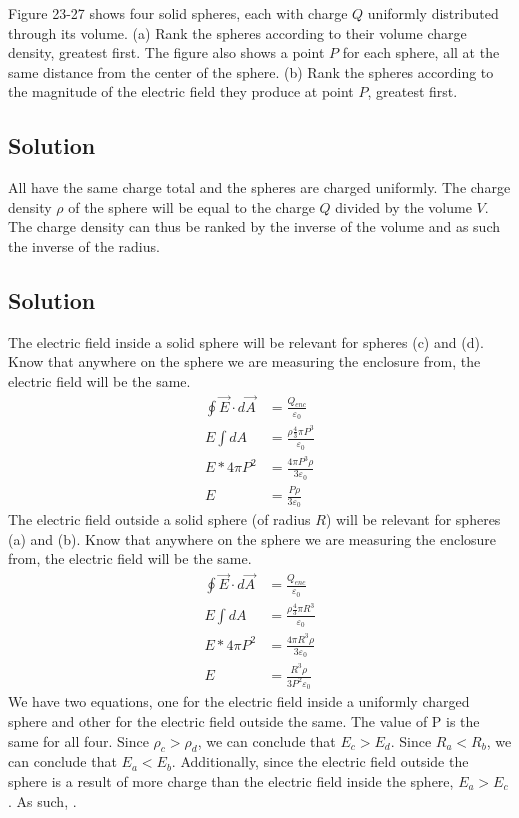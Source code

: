 \documentclass[12pt]{article}
\begin{document}
Figure 23-27 shows four solid spheres, each with charge $Q$ uniformly distributed through its volume. (a) Rank the spheres according to their volume charge density, greatest first. The figure also shows a point $P$ for each sphere, all at the same distance from the center of the sphere. (b) Rank the spheres according to the magnitude of the electric field they produce at point $P$, greatest first.

\subsection{Solution}
All have the same charge total and the spheres are charged uniformly. 
The charge density \(\rho\) of the sphere will be equal to the charge $Q$ divided by the volume $V$. 
The charge density can thus be ranked by the inverse of the volume and as such the inverse of the radius.

\subsection{Solution}
The electric field inside a solid sphere will be relevant for spheres (c) and (d). Know that anywhere on the sphere we are measuring the enclosure from, the electric field will be the same.
\begin{align*}
    \oint \vec{E} \cdot d\vec{A}    &=  \frac{Q_{enc}}{\varepsilon_0}\\
    E \int dA  &=  \frac{\rho \frac{4}{3}\pi P^3}{\varepsilon_0}\\
    E * 4\pi P^2    &=  \frac{4\pi P^3 \rho}{3 \varepsilon_0}\\
    E   &=  \frac{P \rho}{3 \varepsilon_0}
\end{align*}
The electric field outside a solid sphere (of radius $R$) will be relevant for spheres (a) and (b). Know that anywhere on the sphere we are measuring the enclosure from, the electric field will be the same.
\begin{align*}
    \oint \vec{E} \cdot d\vec{A}    &=  \frac{Q_{enc}}{\varepsilon_0}\\
    E \int dA   &=  \frac{\rho \frac{4}{3}\pi R^3}{\varepsilon_0}\\
    E * 4\pi P^2    &=  \frac{4\pi R^3 \rho}{3\varepsilon_0}\\
    E   &=  \frac{R^3 \rho}{3 P^2 \varepsilon_0}
\end{align*}
We have two equations, one for the electric field inside a uniformly charged sphere and other for the electric field outside the same. 
The value of P is the same for all four.
Since $\rho_c > \rho_d$, we can conclude that $E_c > E_d$.
Since $R_a < R_b$, we can conclude that $E_a < E_b$.
Additionally, since the electric field outside the sphere is a result of more charge than the electric field inside the sphere, $E_a > E_c$. 
As such, .
\end{document}
